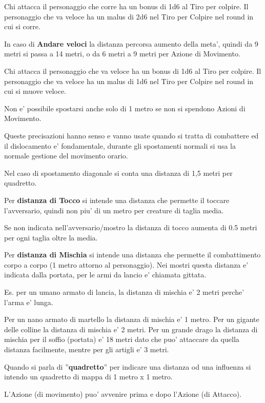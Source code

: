 \documentclass[a4paper,11pt,twoside,openany]{book}
\begin{document}
Chi attacca il personaggio che corre ha un bonus di 1d6 al Tiro per colpire. Il personaggio che va veloce ha un malus di 2d6 nel Tiro per Colpire nel round in cui si corre.

In caso di \textbf{Andare veloci} la distanza percorsa aumento della meta', quindi da 9 metri si passa a 14 metri, o da 6 metri a 9 metri per Azione di Movimento.

Chi attacca il personaggio che va veloce ha un bonus di 1d6 al Tiro per colpire. Il personaggio che va veloce ha un malus di 1d6 nel Tiro per Colpire nel round in cui si muove veloce.

Non e' possibile spostarsi anche solo di 1 metro se non si spendono Azioni di Movimento.

Queste precisazioni hanno senso e vanno usate quando si tratta di combattere ed il dislocamento e' fondamentale, durante gli spostamenti normali si usa la normale gestione del movimento orario.

Nel caso di spostamento diagonale si conta una distanza di 1,5 metri per quadretto.

Per \textbf{distanza di Tocco}  si intende una distanza che permette il toccare l'avversario, quindi non piu' di un metro per creature di taglia media.

Se non indicata nell'avversario/mostro la distanza di tocco aumenta di 0.5 metri per ogni taglia oltre la media.

Per \textbf{distanza di Mischia}  si intende una distanza che permette il combattimento corpo a corpo (1 metro attorno al personaggio). Nei mostri questa distanza e' indicata dalla portata, per le armi da lancio e' chiamata gittata.

Es. per un umano armato di lancia, la distanza di mischia e' 2 metri perche' l'arma e' lunga.

Per un nano armato di martello la distanza di mischia e' 1 metro. Per un gigante delle colline la distanza di mischia e' 2 metri. Per un grande drago la distanza di mischia per il soffio (portata) e' 18 metri dato che puo' attaccare da quella distanza facilmente, mentre per gli artigli e' 3 metri.

Quando si parla di ''\textbf{quadretto}'' per indicare una distanza od una influenza si intendo un quadretto di mappa di 1 metro x 1 metro.

L'Azione (di movimento) puo' avvenire prima e dopo l'Azione (di Attacco).
\end{document}

